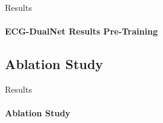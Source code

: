 \begin{frame}{Results}
\framesubtitle{ECG-DualNet Results Pre-Training}
    \begin{table}[!ht]
        \centering
        \caption{Classification results of our proposed approaches on the Icentia$11$k validation set. Only a single training for each model run was conducted.}
        \small{}
        \label{tab:results_Icentia11k}
    \end{table}
    \pause
    \begin{table}[!ht]
        \centering
        \caption{Classification results of our proposed approaches on the 2017 PhysioNet validation set and \newline pre-trained on the Icentia$11$k dataset.}
        \small{}
        \label{tab:pretraining_results}
    \end{table}
\end{frame}

\subsection{Ablation Study}
\begin{frame}{Results}
\framesubtitle{Ablation Study}
    \begin{table}[h!]
        \centering
        \caption{Classification results on the 2017 PhysioNet validation for different ablations. ECG-DualNet L configuration utilized.}
        
        \label{tab:ablations}
    \end{table}
\end{frame}